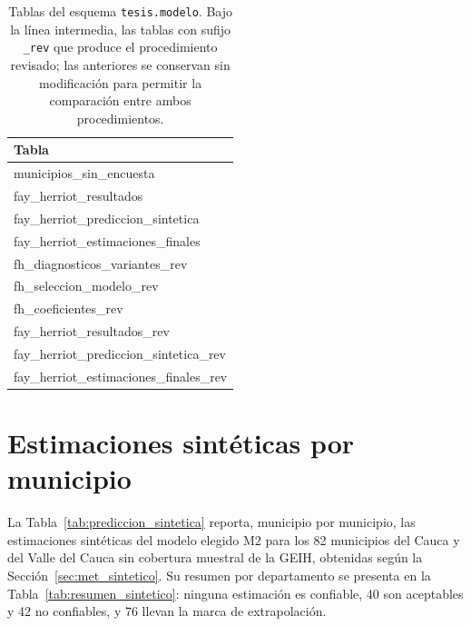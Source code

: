     \begin{table}[H]
    \centering
    \small
    \begin{tabular}{>{\raggedright\arraybackslash\ttfamily}l}
    \toprule
    \textbf{\normalfont Tabla} \\
    \midrule
    municipios\_sin\_encuesta \\
    fay\_herriot\_resultados \\
    fay\_herriot\_prediccion\_sintetica \\
    fay\_herriot\_estimaciones\_finales \\
    \midrule
    fh\_diagnosticos\_variantes\_rev \\
    fh\_seleccion\_modelo\_rev \\
    fh\_coeficientes\_rev \\
    fay\_herriot\_resultados\_rev \\
    fay\_herriot\_prediccion\_sintetica\_rev \\
    fay\_herriot\_estimaciones\_finales\_rev \\
    \bottomrule
    \end{tabular}
    \caption{Tablas del esquema \texttt{tesis.modelo}. Bajo la línea intermedia, las tablas con sufijo \texttt{\_rev} que produce el procedimiento revisado; las anteriores se conservan sin modificación para permitir la comparación entre ambos procedimientos.}
    \label{tab:tablas_modelo}
    \end{table}


\section{Estimaciones sintéticas por municipio}
\label{sec:apendice-sinteticas}

    La Tabla~\ref{tab:prediccion_sintetica} reporta, municipio por municipio, las estimaciones sintéticas del modelo elegido M2 para los 82 municipios del Cauca y del Valle del Cauca sin cobertura muestral de la GEIH, obtenidas según la Sección~\ref{sec:met_sintetico}. Su resumen por departamento se presenta en la Tabla~\ref{tab:resumen_sintetico}: ninguna estimación es confiable, 40 son aceptables y 42 no confiables, y 76 llevan la marca de extrapolación.


